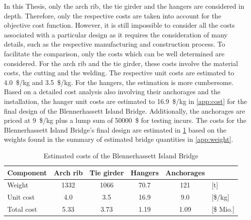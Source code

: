 In this Thesis, only the arch rib, the tie girder and the hangers are considered in depth. Therefore, only the respective costs are taken into account for the objective cost function. However, it is still impossible to consider all the costs associated with a particular design as it requires the consideration of many details, such as the respective manufacturing and construction process. To facilitate the comparison, only the costs which can be well determined are considered. For the arch rib and the tie girder, these costs involve the material costs, the cutting and the welding. The respective unit costs are estimated to \SI{4.0}{\$/kg} and \SI{3.5}{\$/kg}. For the hangers, the estimation is more cumbersome. Based on a detailed cost analysis also involving their anchorages and the installation, the hanger unit costs are estimated to \SI{16.9}{\$/kg} in \cref{app:cost} for the final design of the Blennerhassett Island Bridge. Additionally, the anchorages are priced at \SI{9}{\$/kg} plus a lump sum of \SI{50000}{\$} for testing incurs. The costs for the Blennerhassett Island Bridge's final design are estimated in \cref{tab:cost_example} based on the weights found in the summary of estimated bridge quantities in \cref{app:weight}.

\begin{table}[H]
    \centering
    \caption{Estimated costs of the Blennerhassett Island Bridge}
    \label{tab:cost_example}
    \begin{tabular}{lccccl}
    \toprule
    Component & Arch rib & Tie girder & Hangers & Anchorages &  \\ \midrule
    Weight & \SI{1332}{} & \SI{1066}{} & \SI{70.7}{} & \SI{121}{} & {[}t{]} \\
    Unit cost & \SI{4.0}{} & \SI{3.5}{} & \SI{16.9}{} & \SI{9.0}{} & {[}\$/kg{]} \\
    Total cost & \SI{5.33}{} & \SI{3.73}{} & \SI{1.19}{} & \SI{1.09}{} & [\$ Mio.] \\ \bottomrule
    \end{tabular}
\end{table}

